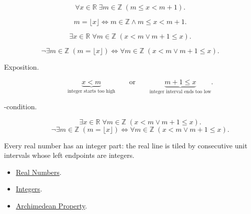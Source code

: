 \begin{remark*}
\[
\forall x\in\mathbb{R}\;\exists m\in\mathbb{Z}\;(m\le x<m+1).
\]
\end{remark*}

\begin{remark*}
\[
m=\lfloor x\rfloor\Longleftrightarrow
m\in\mathbb{Z}\land m\le x<m+1.
\]
\end{remark*}

\begin{remark*}
\[
\exists x\in\mathbb{R}\;\forall m\in\mathbb{Z}\;(x<m\lor m+1\le x).
\]
\end{remark*}

\begin{remark*}
\[
\neg\exists m\in\mathbb{Z}\;(m=\lfloor x\rfloor)
\Longleftrightarrow
\forall m\in\mathbb{Z}\;(x<m\lor m+1\le x).
\]
\end{remark*}

\begin{remark*}
\begin{description}
  \item[Exposition.]
\[
\underbrace{x<m}_{\text{integer starts too high}}
\qquad\text{or}\qquad
\underbrace{m+1\le x}_{\text{integer interval ends too low}}.
\]


  \item[\exists-condition.]
  \[
\exists x\in\mathbb{R}\;\forall m\in\mathbb{Z}\;(x<m\lor m+1\le x).
\]
\[
\neg\exists m\in\mathbb{Z}\;(m=\lfloor x\rfloor)
\Longleftrightarrow
\forall m\in\mathbb{Z}\;(x<m\lor m+1\le x).
\]
\end{description}
\end{remark*}

\begin{remark*}[Interpretation]
Every real number has an integer part: the real line is tiled by consecutive
unit intervals whose left endpoints are integers.
\end{remark*}

\begin{dependencies}
\begin{itemize}
\item \hyperref[def:reals]{Real Numbers}.
\item \hyperref[def:integers]{Integers}.
\item \hyperref[thm:archimedean-property]{Archimedean Property}.
\end{itemize}
\end{dependencies}



